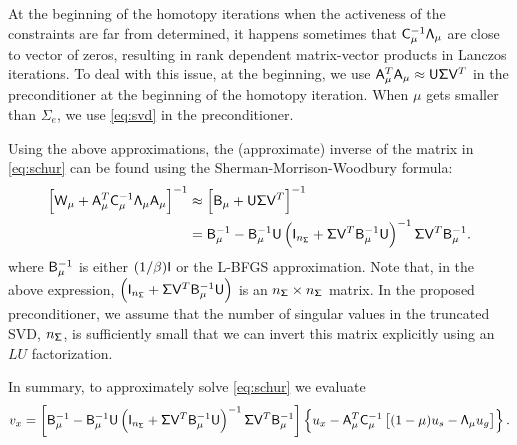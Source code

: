 \begin{remark}
 At the beginning of the homotopy iterations when the activeness of the constraints are far from 
determined, it happens sometimes that  $ \mathsf{C}_\mu^{-1}  \mathsf{\Lambda}_{\mu}$ are close to 
vector of zeros, resulting in rank dependent matrix-vector products in Lanczos iterations. To deal 
with this issue, at the beginning, we use $  \mathsf{A}_\mu^T \mathsf{A}_\mu
  \approx \mathsf{U} \mathsf{\Sigma} \mathsf{V}^T $ in the preconditioner at the beginning of the homotopy iteration. 
  When $\mu$ gets smaller than $\Sigma_e$, we use \eqref{eq:svd} in the preconditioner. 	
\end{remark}

Using the above approximations, the (approximate) inverse of the matrix in
\eqref{eq:schur} can be found using the Sherman-Morrison-Woodbury formula:
\begin{align}
\left[\mathsf{W}_\mu + \mathsf{A}_\mu^T \mathsf{C}_\mu^{-1}  \mathsf{\Lambda}_\mu  \mathsf{A}_\mu \right]^{-1}
&\approx
\left[\mathsf{B}_{\mu} + \mathsf{U} \mathsf{\Sigma} \mathsf{V}^T \right]^{-1} \notag \\
&= \mathsf{B}_\mu^{-1} - \mathsf{B}_\mu^{-1} \mathsf{U}  \left(  \mathsf{I}_{n_{\mathsf{\Sigma}}} +  \mathsf{\Sigma} \mathsf{V}^{T} \mathsf{B}_\mu^{-1} 
\mathsf{U} \right)^{-1} \mathsf{\Sigma} \mathsf{V}^{T} \mathsf{B}_\mu^{-1}.
\label{eq:smw}
\end{align}
where $\mathsf{B}_\mu^{-1}$ is either $(1/\beta)\mathsf{I}$ or the L-BFGS
approximation.  Note that, in the above expression, $\left(\mathsf{I}_{n_{\mathsf{\Sigma}}} +
\mathsf{\Sigma} \mathsf{V}^{T} \mathsf{B}_{\mu}^{-1} \mathsf{U} \right)$ is an $n_{\mathsf{\Sigma}}\times
n_{\mathsf{\Sigma}}$ matrix.  In the proposed preconditioner, we assume that the number of
singular values in the truncated SVD, \ie $n_{\mathsf{\Sigma}}$, is sufficiently small that we
can invert this matrix explicitly using an $LU$ factorization.

In summary, to approximately solve \eqref{eq:schur} we evaluate
\begin{equation}\label{eq:vx}
  v_x = \left[\mathsf{B}_\mu^{-1} - \mathsf{B}_\mu^{-1} \mathsf{U}  \left(  \mathsf{I}_{n_{\mathsf{\Sigma}}} +  \mathsf{\Sigma} \mathsf{V}^{T} 
  \mathsf{B}_\mu^{-1} \mathsf{U} \right)^{-1} \mathsf{\Sigma} \mathsf{V}^{T} \mathsf{B}_\mu^{-1} \right]
  \left\{ u_x - \mathsf{A}_\mu^T \mathsf{C}_{\mu}^{-1} \left[(1-\mu) u_s -
  \mathsf{\Lambda}_\mu u_g \right]\right\}.
\end{equation}


